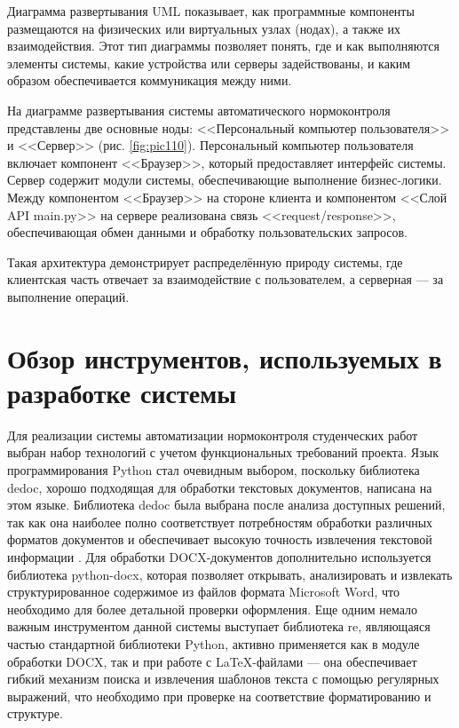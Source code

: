 \documentclass{report}
\begin{document}
Диаграмма развертывания UML показывает, как программные компоненты размещаются на физических или виртуальных узлах (нодах), а также их взаимодействия. Этот тип диаграммы позволяет понять, где и как выполняются элементы системы, какие устройства или серверы задействованы, и каким образом обеспечивается коммуникация между ними.

На диаграмме развертывания системы автоматического нормоконтроля представлены две основные ноды: <<Персональный компьютер пользователя>> и <<Сервер>> (рис.  \ref{fig:pic110}). Персональный компьютер пользователя включает компонент <<Браузер>>, который предоставляет интерфейс системы. Сервер содержит модули системы, обеспечивающие выполнение бизнес-логики. Между компонентом <<Браузер>> на стороне клиента и компонентом <<Слой API main.py>> на сервере реализована связь <<request/response>>, обеспечивающая обмен данными и обработку пользовательских запросов. 


Такая архитектура демонстрирует распределённую природу системы, где клиентская часть отвечает за взаимодействие с пользователем, а серверная --- за выполнение операций.

\section{Обзор инструментов, используемых в разработке системы}

Для реализации системы автоматизации нормоконтроля студенческих работ выбран набор технологий с учетом функциональных требований проекта. Язык программирования Python стал очевидным выбором, поскольку библиотека dedoc, хорошо подходящая для обработки текстовых документов, написана на этом языке. Библиотека dedoc была выбрана после анализа доступных решений, так как она наиболее полно соответствует потребностям обработки различных форматов документов и обеспечивает высокую точность извлечения текстовой информации \cite{dedoc}. Для обработки DOCX-документов дополнительно используется библиотека python-docx, которая позволяет открывать, анализировать и извлекать структурированное содержимое из файлов формата Microsoft Word, что необходимо для более детальной проверки оформления. Еще одним немало важным инструментом данной системы выступает библиотека re, являющаяся частью стандартной библиотеки Python, активно применяется как в модуле обработки DOCX, так и при работе с LaTeX-файлами — она обеспечивает гибкий механизм поиска и извлечения шаблонов текста с помощью регулярных выражений, что необходимо при проверке на соответствие форматированию и структуре.
\end{document}
